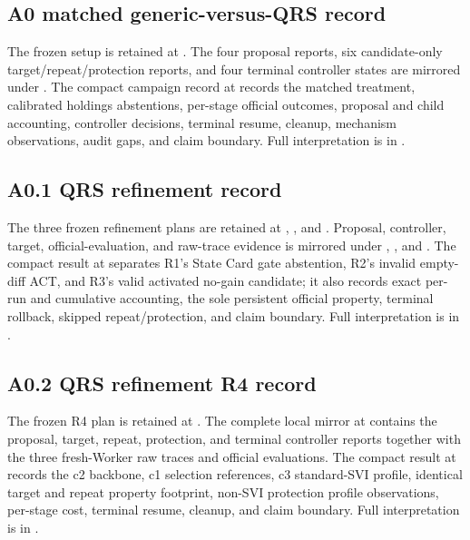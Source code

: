 \subsection{A0 matched generic-versus-QRS record}

The frozen setup is retained at
. The four proposal
reports, six candidate-only target/repeat/protection reports, and four terminal
controller states are mirrored under
.
The compact campaign record at
 records the matched
treatment, calibrated holdings abstentions, per-stage official outcomes,
proposal and child accounting, controller decisions, terminal resume, cleanup,
mechanism observations, audit gaps, and claim boundary. Full interpretation is
in
.

\subsection{A0.1 QRS refinement record}

The three frozen refinement plans are retained at
,
, and
. Proposal, controller,
target, official-evaluation, and raw-trace evidence is mirrored under
,
, and
.
The compact result at
 separates R1's State Card
gate abstention, R2's invalid empty-diff ACT, and R3's valid activated no-gain
candidate; it also records exact per-run and cumulative accounting, the sole
persistent official property, terminal rollback, skipped repeat/protection,
and claim boundary. Full interpretation is in
.

\subsection{A0.2 QRS refinement R4 record}

The frozen R4 plan is retained at
. The complete local
mirror at
contains the proposal, target, repeat, protection, and terminal controller
reports together with the three fresh-Worker raw traces and official
evaluations. The compact result at
 records the c2
backbone, c1 selection references, c3 standard-SVI profile, identical target
and repeat property footprint, non-SVI protection profile observations,
per-stage cost, terminal resume, cleanup, and claim boundary. Full
interpretation is in
.

